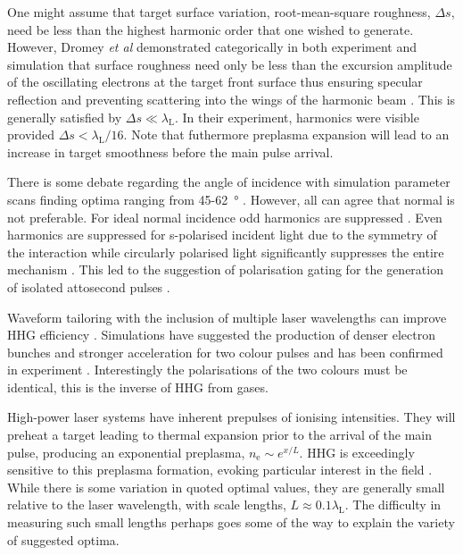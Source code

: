 One might assume that target surface variation, root-mean-square roughness, $\Delta s$, need be less than the highest harmonic order that one wished to generate. However, Dromey \textit{et al} demonstrated categorically in both experiment and simulation that surface roughness need only be less than the excursion amplitude of the oscillating electrons at the target front surface thus ensuring specular reflection and preventing scattering into the wings of the harmonic beam \cite{dromeyDiffractionlimitedPerformanceFocusing2009}. This is generally satisfied by $\Delta s \ll \lambda_\mathrm{L}$. In their experiment, harmonics were visible provided $\Delta s < \lambda_\mathrm{L}/16$. Note that futhermore preplasma expansion will lead to an increase in target smoothness before the main pulse arrival. 

There is some debate regarding the angle of incidence with simulation parameter scans finding optima ranging from 45-\qty{62}{\degree} \cite{edwardsXRayEmissionEffectiveness2020, thauryHighorderHarmonicAttosecond2010, gonoskovUltrarelativisticNanoplasmonicsRoute2011}. However, all can agree that normal is not preferable. For ideal normal incidence odd harmonics are suppressed \cite{lichtersShortpulseLaserHarmonics1996}. Even harmonics are suppressed for s-polarised incident light due to the symmetry of the interaction \cite{dollarEnhancedLaserAbsorption2017} while circularly polarised light significantly suppresses the entire mechanism \cite{savinAttosecondscaleAbsorptionExtreme2017}. This led to the suggestion of polarisation gating for the generation of isolated attosecond pulses \cite{yeungDependenceLaserDrivenCoherent2014}. 

Waveform tailoring with the inclusion of multiple laser wavelengths can improve HHG efficiency \cite{edwardsWaveformControlledRelativisticHighOrderHarmonic2016}. Simulations have suggested the production of denser electron bunches and stronger acceleration for two colour pulses \cite{edwardsEnhancedAttosecondBursts2014} and has been confirmed in experiment \cite{yeungExperimentalObservationAttosecond2017}. Interestingly the polarisations of the two colours must be identical, this is the inverse of HHG from gases.

High-power laser systems have inherent prepulses of ionising intensities. They will preheat a target leading to thermal expansion prior to the arrival of the main pulse, producing an exponential preplasma, $n_\mathrm{e} \sim e^{x/L}$. HHG is exceedingly sensitive to this preplasma formation, evoking particular interest in the field \cite{behmkeControllingSpacingAttosecond2011, rodelHarmonicGenerationRelativistic2012, dollarScalingHighorderHarmonic2013, kahalyDirectObservationDensityGradient2013, vincentiAchievingExtremeLight2019,behmkeControllingSpacingAttosecond2011}. While there is some variation in quoted optimal values, they are generally small relative to the laser wavelength, with scale lengths, $L \approx 0.1 \lambda_\mathrm{L}$. The difficulty in measuring such small lengths perhaps goes some of the way to explain the variety of suggested optima. 

